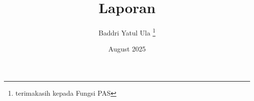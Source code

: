 \documentclass[12pt, a4paper, oneside]{book}
\begin{document}
\frontmatter
\title{Laporan}
\author{Baddri Yatul Ula \thanks{terimakasih kepada Fungsi PAS}}
\date{August 2025}

\maketitle

\pagestyle{frontstyle}





\tableofcontents
\listoffigures
\listoftables

\mainmatter
{}
\pagestyle{mainstyle}







\backmatter
% 


\end{document}
